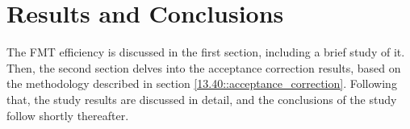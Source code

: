 \section{Results and Conclusions}
\label{14::results_and_conclusions}
    The FMT efficiency is discussed in the first section, including a brief study of it.
    Then, the second section delves into the acceptance correction results, based on the methodology described in section \ref{13.40::acceptance_correction}.
    Following that, the study results are discussed in detail, and the conclusions of the study follow shortly thereafter.

    
    

%
